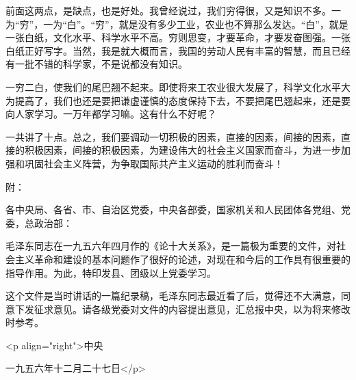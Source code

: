 前面这两点，是缺点，也是好处。我曾经说过，我们穷得很，又是知识不多。一为“穷”，一为“白”。“穷”，就是没有多少工业，农业也不算那么发达。“白”，就是一张白纸，文化水平、科学水平不高。穷则思变，才要革命，才要发奋图强。一张白纸正好写字。当然，我是就大概而言，我国的劳动人民有丰富的智慧，而且已经有一批不错的科学家，不是说都没有知识。

一穷二白，使我们的尾巴翘不起来。即使将来工农业很大发展了，科学文化水平大为提高了，我们也还是要把谦虚谨慎的态度保持下去，不要把尾巴翘起来，还是要向人家学习。一万年都学习嘛。这有什么不好呢？

一共讲了十点。总之，我们要调动一切积极的因素，直接的因素，间接的因素，直接的积极因素，间接的积极因素，为建设伟大的社会主义国家而奋斗，为进一步加强和巩固社会主义阵营，为争取国际共产主义运动的胜利而奋斗！

附：

各中央局、各省、市、自治区党委，中央各部委，国家机关和人民团体各党组、党委，总政治部：

毛泽东同志在一九五六年四月作的《论十大关系》，是一篇极为重要的文件，对社会主义革命和建设的基本问题作了很好的论述，对现在和今后的工作具有很重要的指导作用。为此，特印发县、团级以上党委学习。

这个文件是当时讲话的一篇纪录稿，毛泽东同志最近看了后，觉得还不大满意，同意下发征求意见。请各级党委对文件的内容提出意见，汇总报中央，以为将来修改时参考。

<p align="right">中央

一九五六年十二月二十七日</p>


